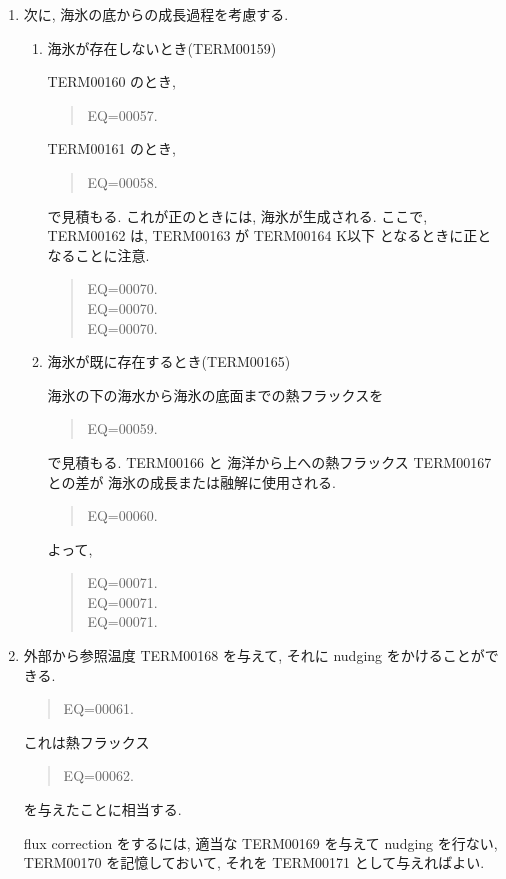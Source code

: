 \begin{enumerate}
\item 次に, 海氷の底からの成長過程を考慮する.

\begin{enumerate}
\item 海氷が存在しないとき(TERM00159)

TERM00160 のとき, 
\begin{quote}
EQ=00057.
\end{quote}
TERM00161 のとき, 
\begin{quote}
EQ=00058.
\end{quote}
で見積もる.
これが正のときには, 海氷が生成される.
ここで,  TERM00162 は, TERM00163 が TERM00164 K以下
となるときに正となることに注意.
\begin{quote}
EQ=00070.\\
EQ=00070.\\
EQ=00070.
\end{quote}

\item 海氷が既に存在するとき(TERM00165)

海氷の下の海水から海氷の底面までの熱フラックスを
\begin{quote}
EQ=00059.
\end{quote}
で見積もる.
TERM00166 と 海洋から上への熱フラックス TERM00167 との差が
海氷の成長または融解に使用される.
\begin{quote}
EQ=00060.
\end{quote}
よって,
\begin{quote}
EQ=00071.\\
EQ=00071.\\
EQ=00071.
\end{quote}
\end{enumerate}

\item 外部から参照温度 TERM00168 を与えて,
      それに nudging をかけることができる.
%      
      \begin{quote}
EQ=00061.
\end{quote}
%
      これは熱フラックス 
      \begin{quote}
EQ=00062.
\end{quote}
      を与えたことに相当する.

      flux correction をするには,
      適当な TERM00169 を与えて nudging を行ない,
      TERM00170 を記憶しておいて,
      それを TERM00171 として与えればよい.

\end{enumerate}



